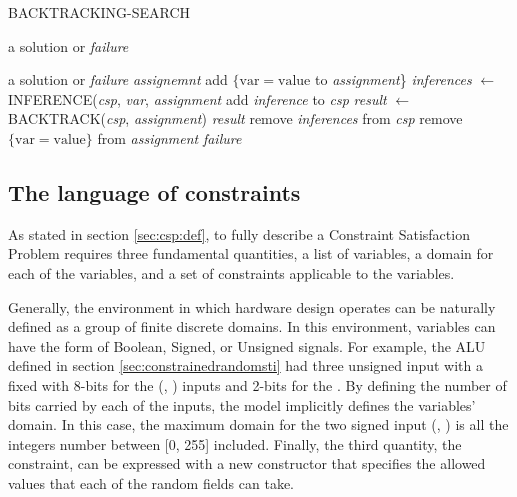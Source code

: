 \begin{algorithm}
\caption{BACKTRACKING-SEARCH} \label{backtracking}
\begin{algorithmic}[1]
 \Return a solution or \textit{failure}
\EndFunction
\end{algorithmic}

\begin{algorithmic}[1]
 \Return a solution or \textit{failure }
\State \Return \textit{assignemnt}
\EndIf
{}
        \State add $\{ \text{var} = \text{value}$ to \textit{assignment}\}
        \State \textit{inferences} $\gets$ INFERENCE(\textit{csp}, \textit{var}, \textit{assignment}
                \State add \textit{inference} to \textit{csp}
                \State \textit{result} $\gets$ BACKTRACK(\textit{csp}, \textit{assignment})
                    \State \Return \textit{result}
                \EndIf
                \State remove \textit{inferences} from \textit{csp}
            \EndIf
            \State remove $\{\text{var} = \text{value}\}$ from \textit{assignment}
    \EndIf
\EndFor
\State \Return \textit{failure}
\EndFunction
\end{algorithmic}
\end{algorithm}

\subsection{The language of constraints}
As stated in section \ref{sec:csp:def}, to fully describe a Constraint
Satisfaction Problem requires three fundamental quantities, a list of variables,
a domain for each of the variables, and a set of constraints applicable to the
variables.

Generally, the environment in which hardware design operates can be naturally
defined as a group of finite discrete domains. In this environment, variables
can have the form of Boolean, Signed, or Unsigned signals. For example, the ALU
defined in section \ref{sec:constrainedrandomsti} had three unsigned input with
a fixed with 8-bits for the (, ) inputs and 2-bits for the
. By defining the number of bits carried by each of the inputs, the
model implicitly defines the variables' domain. In this case, the maximum domain
for the two signed input (, ) is all the integers number
between [0, 255] included. Finally, the third quantity, the constraint, can be
expressed with a new constructor that specifies the allowed values that each of
the random fields can take.

